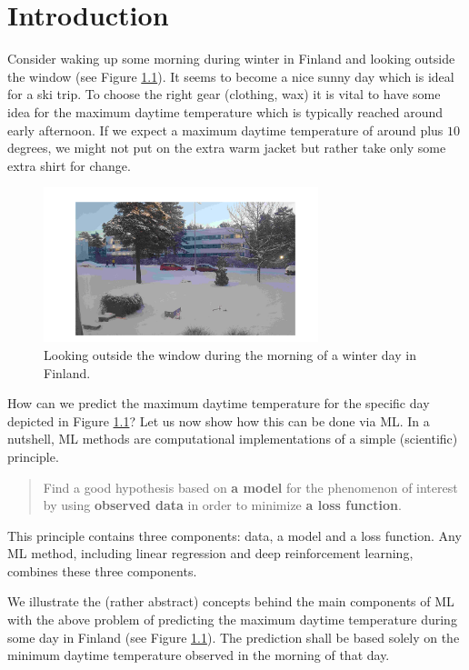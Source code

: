 \documentclass[12pt]{report}
\begin{document}

\tableofcontents                        %


\chapter{Introduction}
Consider waking up some morning during winter in Finland 
and looking outside the window (see Figure \ref{fig:skiday}). 
It seems to become a nice sunny day which is ideal for a 
ski trip. To choose the right gear (clothing, wax) it is 
vital to have some idea for the maximum daytime temperature 
which is typically reached around early afternoon. If we 
expect a maximum daytime temperature of around plus 
$10$ degrees, we might not put on the extra warm jacket 
but rather take only some extra shirt for change. 


\begin{figure}[htbp]
	\centering
	\includegraphics[width=8cm]{SkiDay2.jpeg}
	\caption{Looking outside the window during the morning of a winter day in Finland.}
	\label{fig:skiday}
\end{figure}

How can we predict the maximum daytime temperature for 
the specific day depicted in Figure \ref{fig:skiday}? Let us now 
show how this can be done via ML. In a nutshell, 
ML methods are computational implementations of a simple 
(scientific) principle. 

\begin{quote}
Find a good hypothesis based on {\bf a model} for the phenomenon of interest by 
using {\bf observed data} in order to minimize {\bf a loss function}. 
\end{quote}

This principle contains three components: data, a model and a 
loss function. Any ML method, including linear 
regression and deep reinforcement learning, combines these 
three components.  

We illustrate the (rather abstract) concepts behind the main 
components of ML with the above problem of predicting the 
maximum daytime temperature during some day in Finland (see Figure \ref{fig:skiday}). 
The prediction shall be based solely on the minimum daytime 
temperature observed in the morning of that day. 
\end{document}
